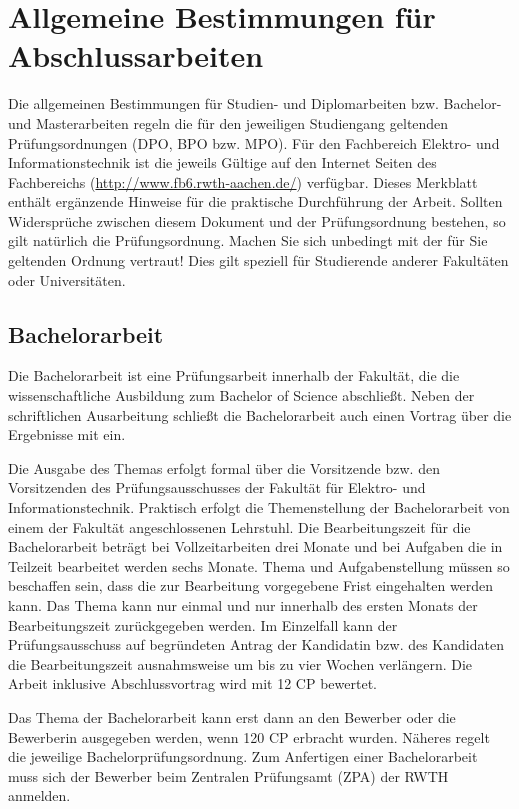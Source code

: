 \chapter{Allgemeine Bestimmungen für Abschlussarbeiten}
Die allgemeinen Bestimmungen für Studien- und Diplomarbeiten bzw. Bachelor- und Masterarbeiten regeln die für den jeweiligen
Studiengang geltenden Prüfungsordnungen (DPO, BPO bzw. MPO). Für den Fachbereich
Elektro- und Informationstechnik ist die jeweils Gültige auf den Internet Seiten des Fachbereichs
(\url{http://www.fb6.rwth-aachen.de/}) verfügbar. Dieses Merkblatt enthält
ergänzende Hinweise für die praktische Durchführung der Arbeit. Sollten Widersprüche zwischen diesem Dokument und der Prüfungsordnung bestehen, so gilt natürlich die Prüfungsordnung. Machen Sie sich unbedingt mit der für Sie geltenden Ordnung vertraut! Dies gilt speziell für Studierende anderer Fakultäten oder Universitäten.


\section{Bachelorarbeit}
Die Bachelorarbeit ist eine Prüfungsarbeit innerhalb der Fakultät, die die wissenschaftliche
Ausbildung zum Bachelor of Science abschließt. Neben der schriftlichen Ausarbeitung schließt
die Bachelorarbeit auch einen Vortrag über die Ergebnisse mit ein. 

Die Ausgabe des Themas erfolgt formal über die Vorsitzende bzw. den Vorsitzenden des
Prüfungsausschusses der Fakultät für Elektro- und Informationstechnik. Praktisch erfolgt die
Themenstellung der Bachelorarbeit von einem der Fakultät angeschlossenen Lehrstuhl. Die
Bearbeitungszeit für die Bachelorarbeit beträgt bei Vollzeitarbeiten drei Monate und bei Aufgaben die
in Teilzeit bearbeitet werden sechs Monate. Thema und
Aufgabenstellung müssen so beschaffen sein, dass die zur Bearbeitung vorgegebene Frist eingehalten
werden kann. Das Thema kann nur einmal und nur innerhalb des ersten Monats der
Bearbeitungszeit zurückgegeben werden. Im Einzelfall kann der Prüfungsausschuss auf begründeten
Antrag der Kandidatin bzw. des Kandidaten die Bearbeitungszeit ausnahmsweise um bis zu vier Wochen
verlängern. Die Arbeit inklusive Abschlussvortrag wird mit 12 CP bewertet.

Das Thema der Bachelorarbeit kann erst dann an den Bewerber oder die Bewerberin ausgegeben werden, wenn 120 CP erbracht wurden. 
Näheres regelt die jeweilige Bachelorprüfungsordnung. Zum Anfertigen einer Bachelorarbeit muss sich der Bewerber beim Zentralen
Prüfungsamt (ZPA) der RWTH anmelden.


